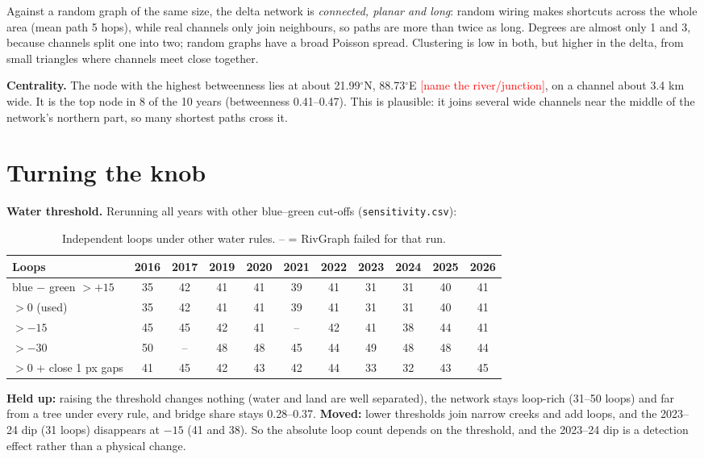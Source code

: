 \documentclass[11pt,a4paper]{article}
\newcommand{\todo}[1]{\textcolor{red}{[#1]}}
\begin{document}
Against a random graph of the same size, the delta network is \emph{connected, planar and long}: random wiring makes shortcuts across the whole area (mean path 5 hops), while real channels only join neighbours, so paths are more than twice as long. Degrees are almost only 1 and 3, because channels split one into two; random graphs have a broad Poisson spread. Clustering is low in both, but higher in the delta, from small triangles where channels meet close together.

\textbf{Centrality.} The node with the highest betweenness lies at about 21.99$^\circ$N, 88.73$^\circ$E \todo{name the river/junction}, on a channel about 3.4 km wide. It is the top node in 8 of the 10 years (betweenness 0.41--0.47). This is plausible: it joins several wide channels near the middle of the network's northern part, so many shortest paths cross it.

\section{Turning the knob}

\textbf{Water threshold.} Rerunning all years with other blue--green cut-offs (\texttt{sensitivity.csv}):

\begin{table}[H]
\centering\footnotesize
\begin{tabular}{@{}lcccccccccc@{}}
\toprule
Loops & 2016 & 2017 & 2019 & 2020 & 2021 & 2022 & 2023 & 2024 & 2025 & 2026 \\
\midrule
blue $-$ green $> +15$ & 35 & 42 & 41 & 41 & 39 & 41 & 31 & 31 & 40 & 41 \\
$> 0$ (used) & 35 & 42 & 41 & 41 & 39 & 41 & 31 & 31 & 40 & 41 \\
$> -15$ & 45 & 45 & 42 & 41 & -- & 42 & 41 & 38 & 44 & 41 \\
$> -30$ & 50 & -- & 48 & 48 & 45 & 44 & 49 & 48 & 48 & 44 \\
$> 0$ + close 1 px gaps & 41 & 45 & 42 & 43 & 42 & 44 & 33 & 32 & 43 & 45 \\
\bottomrule
\end{tabular}
\caption{Independent loops under other water rules. -- = RivGraph failed for that run.}
\end{table}

\textbf{Held up:} raising the threshold changes nothing (water and land are well separated), the network stays loop-rich (31--50 loops) and far from a tree under every rule, and bridge share stays 0.28--0.37. \textbf{Moved:} lower thresholds join narrow creeks and add loops, and the 2023--24 dip (31 loops) disappears at $-15$ (41 and 38). So the absolute loop count depends on the threshold, and the 2023--24 dip is a detection effect rather than a physical change.
\end{document}
